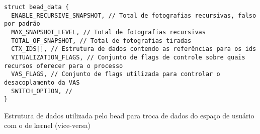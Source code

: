 \begin{pseudocode}

\begin{lstlisting}[language=pseudocode, style=pseudocode]
struct bead_data {
  ENABLE_RECURSIVE_SNAPSHOT, // Total de fotografias recursivas, falso por padrão
  MAX_SNAPSHOT_LEVEL, // Total de fotografias recursivas
  TOTAL_OF_SNAPSHOT, // Total de fotografias tiradas
  CTX_IDS[], // Estrutura de dados contendo as referências para os ids
  VITUALIZATION_FLAGS, // Conjunto de flags de controle sobre quais recursos oferecer para o processo
  VAS_FLAGS, // Conjunto de flags utilizada para controlar o desacoplamento da VAS
  SWITCH_OPTION, // 
}

\end{lstlisting}

  \label{alg:beadata}
  \caption{Estrutura de dados utilizada pelo bead para troca de dados do espaço de usuário com o de kernel (vice-versa)}
\end{pseudocode}

